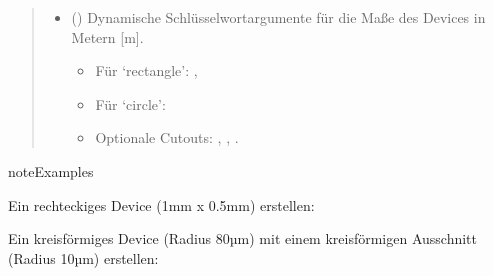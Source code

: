 \documentclass[letterpaper,10pt,english]{sphinxmanual}
\begin{document}
\begin{fulllineitems}
\begin{fulllineitems}
\begin{quote}
\begin{description}
\begin{itemize}
\item {} 
\sphinxAtStartPar
{} () \textendash{} 
\sphinxAtStartPar
Dynamische Schlüsselwortargumente für die Maße
des Devices in Metern {[}m{]}.
\begin{itemize}
\item {} 
\sphinxAtStartPar
Für ‘rectangle’: , 

\item {} 
\sphinxAtStartPar
Für ‘circle’: 

\item {} 
\sphinxAtStartPar
Optionale Cutouts: , ,
.

\end{itemize}


\end{itemize}

\end{description}\end{quote}

\begin{sphinxadmonition}{note}{Examples}

\sphinxAtStartPar
Ein rechteckiges Device (1mm x 0.5mm) erstellen:

\begin{sphinxVerbatim}[commandchars=\\\{\}]
  
    \PYG{p}{[} \PYG{p}{]}
\end{sphinxVerbatim}

\sphinxAtStartPar
Ein kreisförmiges Device (Radius 80µm) mit einem kreisförmigen
Ausschnitt (Radius 10µm) erstellen:

\begin{sphinxVerbatim}[commandchars=\\\{\}]
  
\end{sphinxVerbatim}
\end{sphinxadmonition}


\end{fulllineitems}
\end{fulllineitems}
\end{document}
